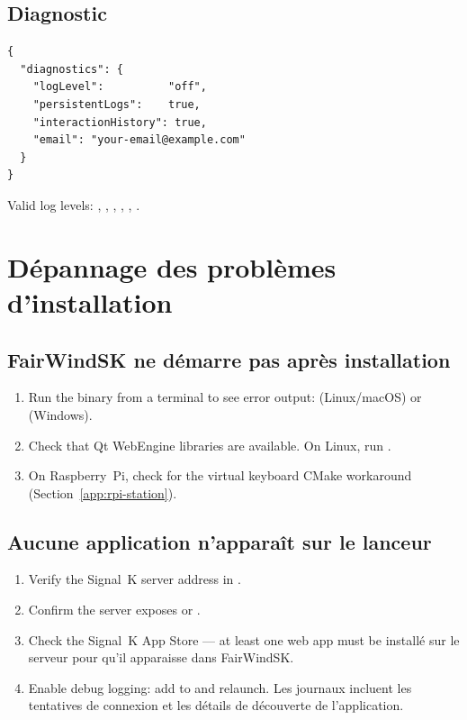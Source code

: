 \subsection{Diagnostic}

\begin{lstlisting}
{
  "diagnostics": {
    "logLevel":          "off",
    "persistentLogs":    true,
    "interactionHistory": true,
    "email": "your-email@example.com"
  }
}
\end{lstlisting}

Valid log levels: , , ,
, , .

\section{Dépannage des problèmes d'installation}
\label{app:troubleshooting-install}

\subsection{FairWindSK ne démarre pas après installation}

\begin{enumerate}
  \item Run the binary from a terminal to see error output:
         (Linux/macOS) or
         (Windows).
  \item Check that Qt WebEngine libraries are available.
        On Linux, run .
  \item On Raspberry~Pi, check for the virtual keyboard CMake workaround
        (Section~\ref{app:rpi-station}).
\end{enumerate}

\subsection{Aucune application n'apparaît sur le lanceur}

\begin{enumerate}
  \item Verify the Signal~K server address in
        .
  \item Confirm the server exposes
         or .
  \item Check the Signal~K App Store --- at least one web app must be
installé sur le serveur pour qu'il apparaisse dans FairWindSK.
  \item Enable debug logging: add  to
         and relaunch.
Les journaux incluent les tentatives de connexion et les détails de découverte de l'application.
\end{enumerate}

